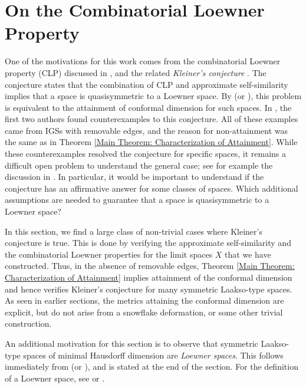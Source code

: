 \documentclass{amsart}
\numberwithin{equation}{section}
\theoremstyle{definition}
\theoremstyle{remark}
\begin{document}
\section{On the Combinatorial Loewner Property}\label{Section: Approximate self-similarity and the Combinatorial Loewner Property}
One of the motivations for this work comes from the combinatorial Loewner property (CLP) discussed in \cite{BourK}, and the related \emph{Kleiner's conjecture} \cite[Conjecture 7.5]{KleinerICM}. The conjecture states that the combination of CLP and approximate self-similarity implies that a space is quasisymmetric to a Loewner space. By \cite[\S 1.6]{CEB} (or \cite[Proposition 11.14]{murugan2023first}), this problem is equivalent to the attainment of conformal dimension for such spaces. In \cite{anttila2024constructions}, the first two authors found counterexamples to this conjecture. All of these examples came from IGSs with removable edges, and the reason for non-attainment was the same as in Theorem \ref{Main Theorem: Characterization of Attainment}. While these counterexamples resolved the conjecture for specific spaces, it remains a difficult open problem to understand the general case; see for example the discussion in \cite{davidsebsphere}. In particular, it would be important to understand if the conjecture has an affirmative answer for some classes of spaces. Which additional assumptions are needed to guarantee that a space is quasisymmetric to a Loewner space?


In this section, we find a large class of non-trivial cases where Kleiner's conjecture is true. This is done by verifying the approximate self-similarity and the combinatorial Loewner properties for the limit spaces $X$ that we have constructed. Thus, in the absence of removable edges, Theorem \ref{Main Theorem: Characterization of Attainment} implies attainment of the conformal dimension and hence verifies Kleiner's conjecture for many symmetric Laakso-type spaces. As seen in earlier sections, the metrics attaining the conformal dimension are explicit, but do not arise from a snowflake deformation, or some other trivial construction.

An additional motivation for this section is to observe that symmetric Laakso-type spaces of minimal Hausdorff dimension are \emph{Loewner spaces}. This follows immediately from \cite[\S 1.6]{Ch} (or \cite[Proposition 11.14]{murugan2023first}), and is stated at the end of the section. For the definition of a Loewner space, see \cite[Definition 1.11]{Ch} or \cite{HK}.
\end{document}
